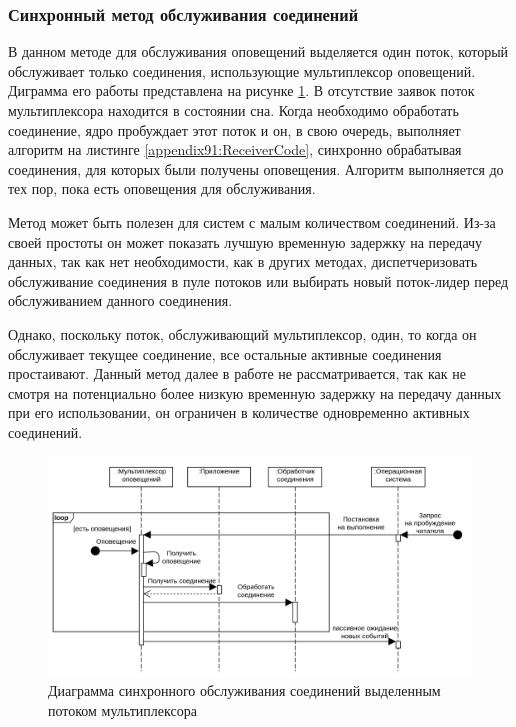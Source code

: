 \subsubsection{Синхронный метод обслуживания соединений}

В данном методе для обслуживания оповещений выделяется один поток, который обслуживает только соединения, использующие мультиплексор оповещений. Диграмма его работы представлена на рисунке \ref{chapter31:SyncMuxSchema}.
В отсутствие заявок поток мультиплексора находится в состоянии сна. Когда необходимо обработать соединение, ядро пробуждает этот поток и он, в свою очередь, выполняет алгоритм на листинге \ref{appendix91:ReceiverCode}, синхронно обрабатывая соединения, для которых были получены оповещения. Алгоритм выполняется до тех пор, пока есть оповещения для обслуживания.

Метод может быть полезен для систем с малым количеством соединений. Из-за своей простоты он может показать лучшую временную задержку на передачу данных, так как нет необходимости, как в других методах, диспетчеризовать обслуживание соединения в пуле потоков или выбирать новый поток-лидер перед обслуживанием данного соединения.

Однако, поскольку поток, обслуживающий мультиплексор, один, то когда он обслуживает текущее соединение, все остальные активные соединения простаивают. Данный метод далее в работе не рассматривается, так как не смотря на потенциально более низкую временную задержку на передачу данных при его использовании, он ограничен в количестве одновременно активных соединений.

\begin{figure}[!h]
\caption{Диаграмма синхронного обслуживания соединений выделенным потоком мультиплексора}
\label{chapter31:SyncMuxSchema}
\includegraphics[width=\textwidth]{../../graphics/schemes/SyncMuxSequence}
\end{figure}


